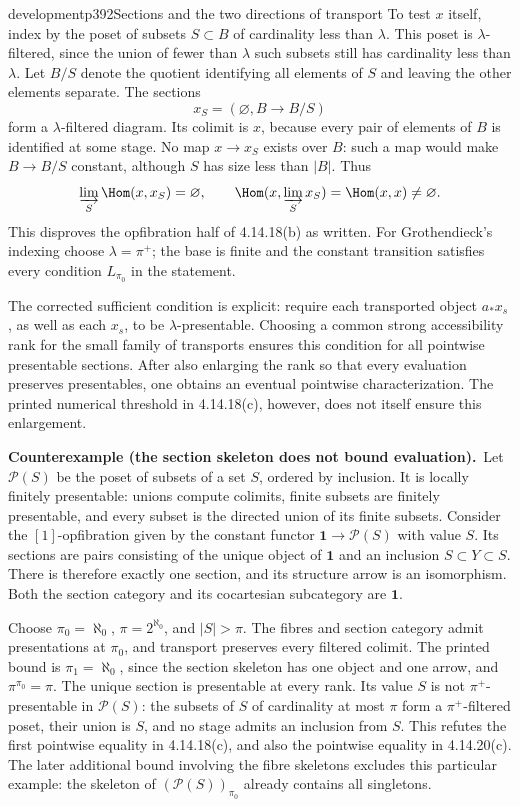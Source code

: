 \begin{dcomment}{development}{p392}{Sections and the two directions of transport}
To test $x$ itself, index by the poset of subsets $S\subset B$ of cardinality less than $\lambda$. This poset is $\lambda$-filtered, since the union of fewer than $\lambda$ such subsets still has cardinality less than $\lambda$. Let $B/S$ denote the quotient identifying all elements of $S$ and leaving the other elements separate. The sections
\[
 x_S=(\varnothing,B\longrightarrow B/S)
\]
form a $\lambda$-filtered diagram. Its colimit is $x$, because every pair of elements of $B$ is identified at some stage. No map $x\to x_S$ exists over $B$: such a map would make $B\to B/S$ constant, although $S$ has size less than $|B|$. Thus
\[
 \varinjlim_S\Hom(x,x_S)=\varnothing,
 \qquad
 \Hom(x,\varinjlim_Sx_S)=\Hom(x,x)\ne\varnothing.
\]
This disproves the opfibration half of 4.14.18(b) as written. For Grothendieck's indexing choose $\lambda=\pi^+$; the base is finite and the constant transition satisfies every condition $L_{\pi_0}$ in the statement.

The corrected sufficient condition is explicit: require each transported object $a_*x_s$, as well as each $x_s$, to be $\lambda$-presentable. Choosing a common strong accessibility rank for the small family of transports ensures this condition for all pointwise presentable sections. After also enlarging the rank so that every evaluation preserves presentables, one obtains an eventual pointwise characterization. The printed numerical threshold in 4.14.18(c), however, does not itself ensure this enlargement.

\textbf{Counterexample (the section skeleton does not bound evaluation).}\ours\ 
Let $\mathcal P(S)$ be the poset of subsets of a set $S$, ordered by inclusion. It is locally finitely presentable: unions compute colimits, finite subsets are finitely presentable, and every subset is the directed union of its finite subsets. Consider the $[1]$-opfibration given by the constant functor $\mathbf1\to\mathcal P(S)$ with value $S$. Its sections are pairs consisting of the unique object of $\mathbf1$ and an inclusion $S\subset Y\subset S$. There is therefore exactly one section, and its structure arrow is an isomorphism. Both the section category and its cocartesian subcategory are $\mathbf1$.

Choose $\pi_0=\aleph_0$, $\pi=2^{\aleph_0}$, and $|S|>\pi$. The fibres and section category admit presentations at $\pi_0$, and transport preserves every filtered colimit. The printed bound is $\pi_1=\aleph_0$, since the section skeleton has one object and one arrow, and $\pi^{\pi_0}=\pi$. The unique section is presentable at every rank. Its value $S$ is not $\pi^+$-presentable in $\mathcal P(S)$: the subsets of $S$ of cardinality at most $\pi$ form a $\pi^+$-filtered poset, their union is $S$, and no stage admits an inclusion from $S$. This refutes the first pointwise equality in 4.14.18(c), and also the pointwise equality in 4.14.20(c). The later additional bound involving the fibre skeletons excludes this particular example: the skeleton of $(\mathcal P(S))_{\pi_0}$ already contains all singletons.


\end{dcomment}
